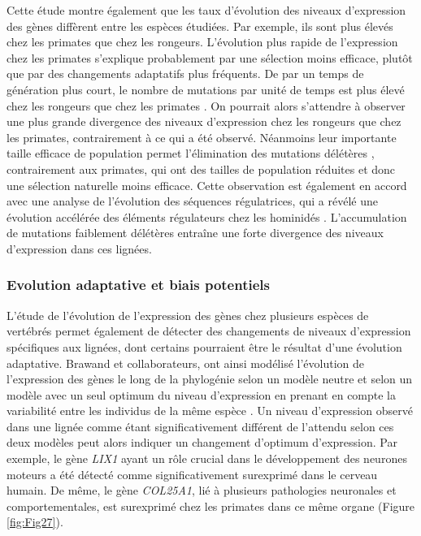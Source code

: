 Cette étude montre également que les taux d’évolution des niveaux d'expression des gènes diffèrent entre les espèces étudiées. Par exemple, ils sont plus élevés chez les primates que chez les rongeurs. L'évolution plus rapide de l'expression chez les primates s'explique probablement par une sélection moins efficace, plutôt que par des changements adaptatifs plus fréquents. De par un temps de génération plus court, le nombre de mutations par unité de temps est plus élevé chez les rongeurs que chez les primates \citep{li_rates_1996}. On pourrait alors s’attendre à observer une plus grande divergence des niveaux d’expression chez les rongeurs que chez les primates, contrairement à ce qui a été observé. Néanmoins leur importante taille efficace de population permet l’élimination des mutations délétères \citep{ohta_slightly_1973}, contrairement aux primates, qui ont des tailles de population réduites et donc une sélection naturelle moins efficace. Cette observation est également en accord avec une analyse de l'évolution des séquences régulatrices, qui a révélé une évolution accélérée des éléments régulateurs chez les hominidés \citep{keightley_evidence_2005}. L’accumulation de mutations faiblement délétères entraîne une forte divergence des niveaux d’expression dans ces lignées.

\subsubsection{Evolution adaptative et biais potentiels}
\label{subsec:evol-adaptative}

L’étude de l’évolution de l’expression des gènes chez plusieurs espèces de vertébrés permet également de détecter des changements de niveaux d’expression spécifiques aux lignées, dont certains pourraient être le résultat d’une évolution adaptative. Brawand et collaborateurs, ont ainsi modélisé l’évolution de l’expression des gènes le long de la phylogénie selon un modèle neutre et selon un modèle avec un seul optimum du niveau d'expression en prenant en compte la variabilité entre les individus de la même espèce \citep{brawand_evolution_2011}. Un niveau d’expression observé dans une lignée comme étant significativement différent de l’attendu selon ces deux modèles peut alors indiquer un changement d’optimum d’expression. Par exemple, le gène \textit{LIX1} ayant un rôle crucial dans le développement des neurones moteurs a été détecté comme significativement surexprimé dans le cerveau humain. De même, le gène \textit{COL25A1}, lié à plusieurs pathologies neuronales et comportementales, est surexprimé chez les primates dans ce même organe (Figure \ref{fig:Fig27}). 

